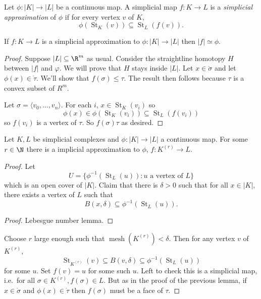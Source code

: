 \documentclass[a4paper]{article}
\newcommand{\interior}{\mathring} %
\DeclareMathOperator{\mesh}{mesh}
\DeclareMathOperator{\St}{St} %
\begin{document}
\begin{definition}
  Let \(\phi: |K| \to |L|\) be a continuous map. A simplicial map \(f: K \to L\) is a \emph{simplicial approximation} of \(\phi\) if for every vertex \(v\) of \(K\),
  \[
    \phi(\St_K(v)) \subseteq \St_L(f(v)).
  \]
\end{definition}

\begin{lemma}
  If \(f: K \to L\) is a simplicial approximation to \(\phi: |K| \to |L|\) then \(|f| \simeq \phi\).
\end{lemma}

\begin{proof}
  Suppose \(|L| \subseteq \R^m\) as usual. Consider the straightline homotopy \(H\) between \(|f|\) and \(\varphi\). We will prove that \(H\) stays inside \(|L|\). Let \(x \in \interior \sigma\) and let \(\phi(x) \in \interior \tau\). We'll show that \(f(\sigma) \leq \tau\). The result then follows because \(\tau\) is a convex subset of \(R^m\).

  Let \(\sigma = \langle v_0, \dots, v_n \rangle\). For each \(i\), \(x \in \St_K(v_i)\) so
  \[
    \phi(x) \in \phi(\St_K(v_i)) \subseteq \St_L(f(v_i))
  \]
  so \(f(v_i)\) is a vertex of \(\tau\). So \(f(\sigma) \tau\) as desired.
\end{proof}

\begin{theorem}
  Let \(K, L\) be simplicial complexes and \(\phi: |K| \to |L|\) a continuous map. For some \(r \in \N\) there is a implicial approximation to \(\phi\), \(f: K^{(r)} \to L\).
\end{theorem}

\begin{proof}
  Let
  \[
    U = \{\phi^{-1}(\St_L(u)): u \text{ a vertex of } L\}
  \]
  which is an open cover of \(|K|\). Claim that there is \(\delta > 0\) such that for all \(x \in |K|\), there exists a vertex of \(L\) such that
  \[
    B(x, \delta) \subseteq \phi^{-1}(\St_L(u)).
  \]

  \begin{proof}
    Lebesgue number lemma.
  \end{proof}
  Choose \(r\) large enough such that \(\mesh(K^{(r)}) < \delta\). Then for any vertex \(v\) of \(K^{(r)}\),
  \[
    \St_{K^{(r)}}(v) \subseteq B(v, \delta) \subseteq \phi^{-1}(\St_L(u))
  \]
  for some \(u\). Set \(f(v) = u\) for some such \(u\). Left to check this is a simplicial map, i.e.\ for all \(\sigma \in K^{(r)}, f(\sigma) \in L\). But as in the proof of the previous lemma, if \(x \in \interior \sigma\) and \(\phi(x) \in \interior \tau\) then \(f(\sigma)\) must be a face of \(\tau\).
\end{proof}
\end{document}
